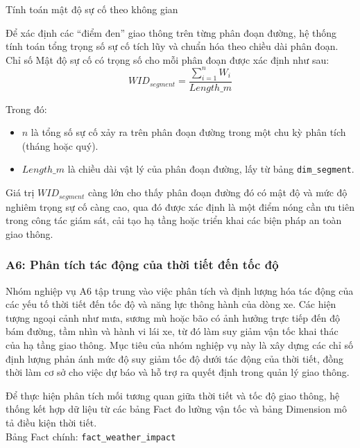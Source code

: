 Tính toán mật độ sự cố theo không gian

Để xác định các ``điểm đen'' giao thông trên từng phân đoạn đường, hệ thống tính toán tổng trọng số sự cố tích lũy và chuẩn hóa theo chiều dài phân đoạn. Chỉ số Mật độ sự cố có trọng số cho mỗi phân đoạn được xác định như sau:
\[
WID_{segment} = \frac{\sum_{i=1}^{n} W_i}{Length\_m}
\]

Trong đó:
\begin{itemize}
    \item $n$ là tổng số sự cố xảy ra trên phân đoạn đường trong một chu kỳ phân tích (tháng hoặc quý).
    \item $Length\_m$ là chiều dài vật lý của phân đoạn đường, lấy từ bảng \texttt{dim\_segment}.
\end{itemize}

Giá trị $WID_{segment}$ càng lớn cho thấy phân đoạn đường đó có mật độ và mức độ nghiêm trọng sự cố càng cao, qua đó được xác định là một điểm nóng cần ưu tiên trong công tác giám sát, cải tạo hạ tầng hoặc triển khai các biện pháp an toàn giao thông.

\subsubsection{A6: Phân tích tác động của thời tiết đến tốc độ}

Nhóm nghiệp vụ A6 tập trung vào việc phân tích và định lượng hóa tác động của các yếu tố thời tiết đến tốc độ và năng lực thông hành của dòng xe. Các hiện tượng ngoại cảnh như mưa, sương mù hoặc bão có ảnh hưởng trực tiếp đến độ bám đường, tầm nhìn và hành vi lái xe, từ đó làm suy giảm vận tốc khai thác của hạ tầng giao thông. Mục tiêu của nhóm nghiệp vụ này là xây dựng các chỉ số định lượng phản ánh mức độ suy giảm tốc độ dưới tác động của thời tiết, đồng thời làm cơ sở cho việc dự báo và hỗ trợ ra quyết định trong quản lý giao thông.\\


Để thực hiện phân tích mối tương quan giữa thời tiết và tốc độ giao thông, hệ thống kết hợp dữ liệu từ các bảng Fact đo lường vận tốc và bảng Dimension mô tả điều kiện thời tiết.\\

Bảng Fact chính: \texttt{fact\_weather\_impact}

